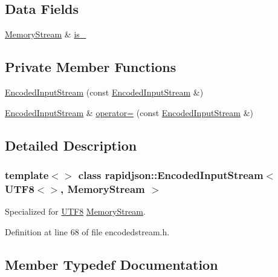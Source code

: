 \subsection*{Data Fields}
\begin{DoxyCompactItemize}
\item 
\mbox{\hyperlink{structrapidjson_1_1_memory_stream}{Memory\+Stream}} \& \mbox{\hyperlink{classrapidjson_1_1_encoded_input_stream_3_01_u_t_f8_3_4_00_01_memory_stream_01_4_ac28dccc556d38360434cc36d4b5e7222}{is\+\_\+}}
\end{DoxyCompactItemize}
\subsection*{Private Member Functions}
\begin{DoxyCompactItemize}
\item 
\mbox{\hyperlink{classrapidjson_1_1_encoded_input_stream_3_01_u_t_f8_3_4_00_01_memory_stream_01_4_a08e252b350b6a4445fef79063a2aeb11}{Encoded\+Input\+Stream}} (const \mbox{\hyperlink{classrapidjson_1_1_encoded_input_stream}{Encoded\+Input\+Stream}} \&)
\item 
\mbox{\hyperlink{classrapidjson_1_1_encoded_input_stream}{Encoded\+Input\+Stream}} \& \mbox{\hyperlink{classrapidjson_1_1_encoded_input_stream_3_01_u_t_f8_3_4_00_01_memory_stream_01_4_a2b9dea1e14246ac134297b3006ea7275}{operator=}} (const \mbox{\hyperlink{classrapidjson_1_1_encoded_input_stream}{Encoded\+Input\+Stream}} \&)
\end{DoxyCompactItemize}


\subsection{Detailed Description}
\subsubsection*{template$<$$>$\newline
class rapidjson\+::\+Encoded\+Input\+Stream$<$ U\+T\+F8$<$$>$, Memory\+Stream $>$}

Specialized for \mbox{\hyperlink{structrapidjson_1_1_u_t_f8}{U\+T\+F8}} \mbox{\hyperlink{structrapidjson_1_1_memory_stream}{Memory\+Stream}}. 

Definition at line 68 of file encodedstream.\+h.



\subsection{Member Typedef Documentation}
\mbox{\label{classrapidjson_1_1_encoded_input_stream_3_01_u_t_f8_3_4_00_01_memory_stream_01_4_a907f1851cfe76ae1c3eb9e2074bfa507}} 
